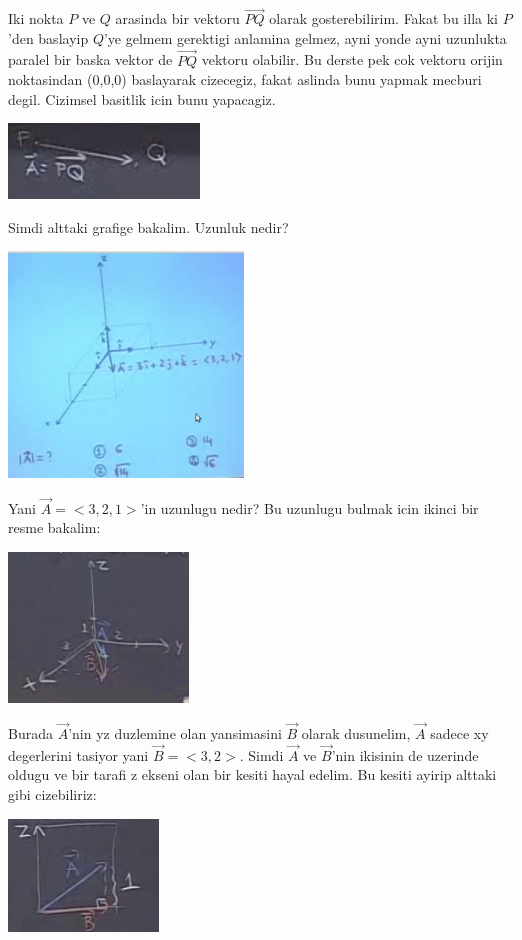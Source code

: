 \documentclass[12pt,fleqn]{article}
\begin{document}
Iki nokta $P$ ve $Q$ arasinda bir vektoru $\vec{PQ}$ olarak
gosterebilirim. Fakat bu illa ki $P$'den baslayip $Q$'ye gelmem gerektigi
anlamina gelmez, ayni yonde ayni uzunlukta paralel bir baska vektor de
$\vec{PQ}$ vektoru olabilir. Bu derste pek cok vektoru orijin noktasindan (0,0,0)
baslayarak cizecegiz, fakat aslinda bunu yapmak mecburi degil. Cizimsel
basitlik icin bunu yapacagiz. 

\includegraphics[height=2cm]{1_2.png}

Simdi alttaki grafige bakalim. Uzunluk nedir?

\includegraphics[height=6cm]{1_3.png}

Yani $\vec{A} = <3,2,1>$'in uzunlugu nedir?  Bu uzunlugu bulmak icin ikinci bir
resme bakalim:

\includegraphics[height=4cm]{1_4.png}

Burada $\vec{A}$'nin yz duzlemine olan yansimasini $\vec{B}$ olarak
dusunelim, $\vec{A}$ sadece xy degerlerini tasiyor yani $\vec{B} = <3,2>$.
Simdi $\vec{A}$ ve $\vec{B}$'nin ikisinin de uzerinde oldugu ve bir tarafi
z ekseni olan bir kesiti hayal edelim. Bu kesiti ayirip alttaki gibi
cizebiliriz:

\includegraphics[height=3cm]{1_5.png}
\end{document}
